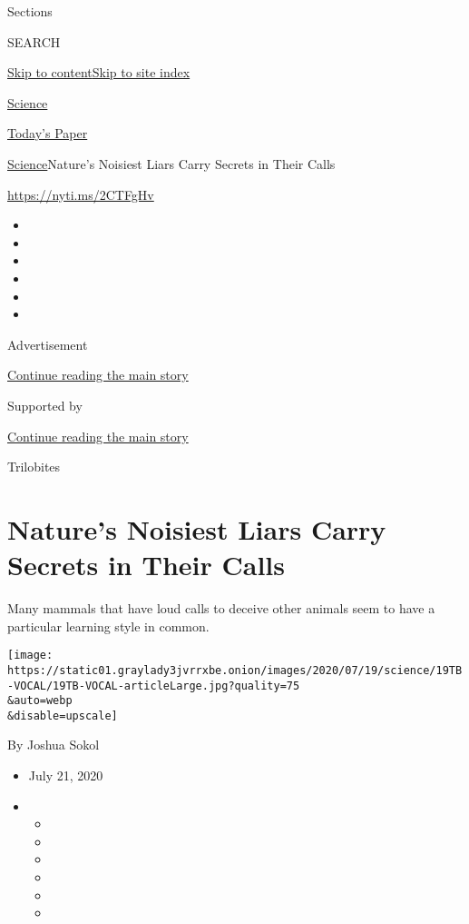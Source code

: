 Sections

SEARCH

\protect\hyperlink{site-content}{Skip to
content}\protect\hyperlink{site-index}{Skip to site index}

\href{https://www.nytimes3xbfgragh.onion/section/science}{Science}

\href{https://myaccount.nytimes3xbfgragh.onion/auth/login?response_type=cookie\&client_id=vi}{}

\href{https://www.nytimes3xbfgragh.onion/section/todayspaper}{Today's
Paper}

\href{/section/science}{Science}\textbar{}Nature's Noisiest Liars Carry
Secrets in Their Calls

\url{https://nyti.ms/2CTFgHv}

\begin{itemize}
\item
\item
\item
\item
\item
\item
\end{itemize}

Advertisement

\protect\hyperlink{after-top}{Continue reading the main story}

Supported by

\protect\hyperlink{after-sponsor}{Continue reading the main story}

Trilobites

\hypertarget{natures-noisiest-liars-carry-secrets-in-their-calls}{%
\section{Nature's Noisiest Liars Carry Secrets in Their
Calls}\label{natures-noisiest-liars-carry-secrets-in-their-calls}}

Many mammals that have loud calls to deceive other animals seem to have
a particular learning style in common.

\texttt{[image: https://static01.graylady3jvrrxbe.onion/images/2020/07/19/science/19TB-VOCAL/19TB-VOCAL-articleLarge.jpg?quality=75\\\&auto=webp\\\&disable=upscale]}

By Joshua Sokol

\begin{itemize}
\item
  July 21, 2020
\item
  \begin{itemize}
  \item
  \item
  \item
  \item
  \item
  \item
  \end{itemize}
\end{itemize}

